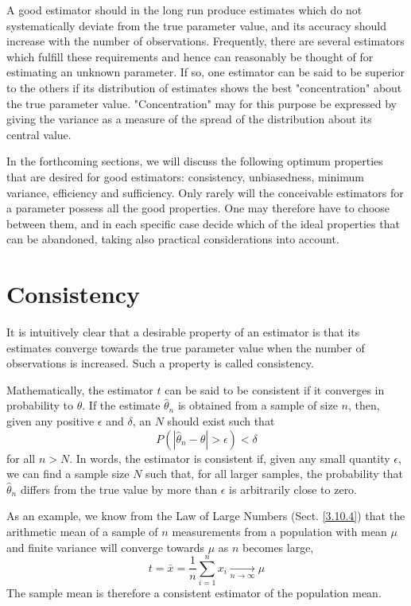 \documentclass[../main.tex]{subfiles}
\begin{document}
A good estimator should in the long run produce estimates
which do not systematically deviate from the true parameter value,
and its accuracy should increase with the number of observations.
Frequently, there are several estimators which fulfill these requirements
and hence can reasonably be thought of for estimating an unknown parameter.
If so, one estimator can be said to be superior to the others
if its distribution of estimates shows the best "concentration" about the true parameter value. 
"Concentration" may for this purpose be expressed by giving the variance as a measure of the spread of the distribution about its central value.

In the forthcoming sections,
we will discuss the following optimum properties that are desired for good estimators:
consistency, unbiasedness, minimum variance, efficiency and sufficiency.
Only rarely will the conceivable estimators for a parameter possess all the good properties.
One may therefore have to choose between them,
and in each specific case decide which of the ideal properties that can be abandoned,
taking also practical considerations into account.

\section{Consistency}

It is intuitively clear that a desirable property of an estimator
is that its estimates converge towards the true parameter value
when the number of observations is increased.
Such a property is called consistency.

Mathematically, the estimator $t$ can be said to be consistent if it converges in probability to $\theta$.
If the estimate $\hat{\theta}_n$ is obtained from a sample of size $n$,
then, given any positive $\epsilon$ and $\delta$,
an $N$ should exist such that
%
\begin{equation}
    P(|\hat{\theta}_n - \theta| > \epsilon) < \delta
    \label{eq:8.2}
\end{equation}
%
for all $n > N$.
In words,
the estimator is consistent if,
given any small quantity $\epsilon$,
we can find a sample size $N$ such that,
for all larger samples,
the probability that $\hat{\theta}_n$ differs from the true value by more than $\epsilon$
is arbitrarily close to zero.

As an example,
we know from the Law of Large Numbers (Sect. \ref{3.10.4}) that
the arithmetic mean of a sample of $n$ measurements
from a population with mean $\mu$ and finite variance
will converge towards $\mu$ as $n$ becomes large,
%
\begin{equation}
    t
    = \bar{x}
    = \frac{1}{n} \sum_{i=1}^n x_i
    \xrightarrow[n \to \infty]{} \mu
\end{equation}
%
The sample mean is therefore a consistent estimator of the population mean.
\end{document}
